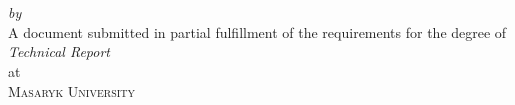 \begin{titlepage}
  \vspace*{5cm}
  \makeatletter
  \begin{center}
    \begin{Huge}
      \@title
    \end{Huge}\\[0.1cm]
    \begin{Large}
      \@subtitle
    \end{Large}\\
    \emph{by}\\
    \@author
    \vfill
    A document submitted in partial fulfillment
    of the requirements for the degree of\\
    \emph{Technical Report}\\
    at\\
    \textsc{Masaryk University}
  \end{center}
  \makeatother
\end{titlepage}

\newpage
\null
\thispagestyle{empty}
\newpage
